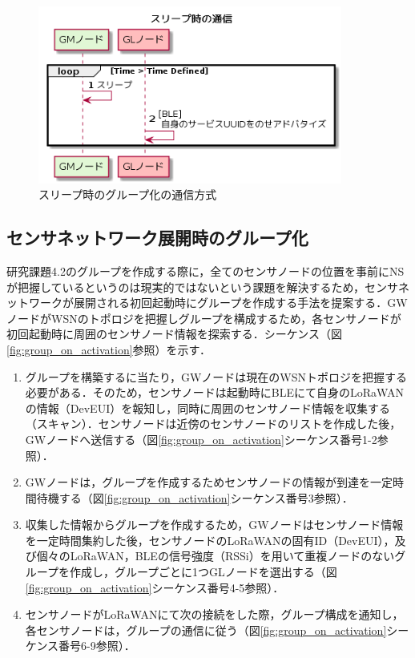 \begin{figure}[]
    \begin{center}
    \includegraphics[width=10cm]{figures/v2.0/スリープ時の通信.png}
    \caption{スリープ時のグループ化の通信方式}
    \label{fig:group_sleep}
    \end{center}
\end{figure}

\subsection{センサネットワーク展開時のグループ化}
研究課題4.2のグループを作成する際に，全てのセンサノードの位置を事前にNSが把握しているというのは現実的ではないという課題を解決するため，センサネットワークが展開される初回起動時にグループを作成する手法を提案する．GWノードがWSNのトポロジを把握しグループを構成するため，各センサノードが初回起動時に周囲のセンサノード情報を探索する．シーケンス（図\ref{fig:group_on_activation}参照）を示す．

\begin{enumerate}
    \item グループを構築するに当たり，GWノードは現在のWSNトポロジを把握する必要がある．そのため，センサノードは起動時にBLEにて自身のLoRaWANの情報（DevEUI）を報知し，同時に周囲のセンサノード情報を収集する（スキャン）．センサノードは近傍のセンサノードのリストを作成した後，GWノードへ送信する（図\ref{fig:group_on_activation}シーケンス番号1-2参照）．
    \item GWノードは，グループを作成するためセンサノードの情報が到達を一定時間待機する（図\ref{fig:group_on_activation}シーケンス番号3参照）．
    \item 収集した情報からグループを作成するため，GWノードはセンサノード情報を一定時間集約した後，センサノードのLoRaWANの固有ID（DevEUI），及び個々のLoRaWAN，BLEの信号強度（RSSi）を用いて重複ノードのないグループを作成し，グループごとに1つGLノードを選出する（図\ref{fig:group_on_activation}シーケンス番号4-5参照）．
    \item センサノードがLoRaWANにて次の接続をした際，グループ構成を通知し，各センサノードは，グループの通信に従う（図\ref{fig:group_on_activation}シーケンス番号6-9参照）．
\end{enumerate}

